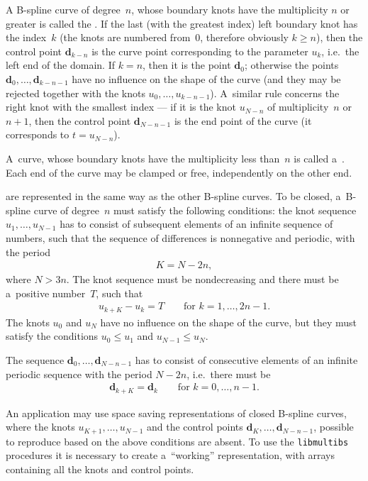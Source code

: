 A B-spline curve of degree~$n$, whose boundary knots have the multiplicity
$n$ or greater is called the .
If the last (with the greatest index) left boundary knot has the index~$k$
(the knots are numbered from~$0$, therefore obviously $k\geq n$), then the
control point $\bm{d}_{k-n}$ is the curve point corresponding to
the parameter $u_k$, i.e.\ the left end of the domain. If $k=n$, then it is
the point $\bm{d}_0$; otherwise the points $\bm{d}_0,\ldots,\bm{d}_{k-n-1}$
have no influence on the shape of the curve (and they may be rejected
together with the knots $u_0,\ldots,u_{k-n-1}$).
A~similar rule concerns the right knot with the smallest index --- if it is
the knot $u_{N-n}$ of multiplicity~$n$ or $n+1$, then the control point
$\bm{d}_{N-n-1}$ is the end point of the curve (it corresponds to $t=u_{N-n}$).

A~curve, whose boundary knots have the multiplicity less than~$n$
is called a~. Each end of the curve may be clamped
or free, independently on the other end.

\vspace{\medskipamount}
 are represented in the same way as the other
B-spline curves. To be closed, a~B-spline curve of degree~$n$ must satisfy
the following conditions: the knot sequence $u_1,\ldots,u_{N-1}$ has to
consist of subsequent elements of an infinite sequence of numbers,
such that the sequence of differences is nonnegative and periodic, with the period
\begin{align*}
  K=N-2n,
\end{align*}
where $N>3n$. The knot sequence must be nondecreasing and there must be
a~positive number~$T$, such that
\begin{align*}
  u_{k+K}-u_k=T\qquad\mbox{for $k=1,\ldots,2n-1$.}
\end{align*}
The knots $u_0$ and $u_N$ have no influence on the shape of the curve,
but they must satisfy the conditions $u_0\leq u_1$ and $u_{N-1}\leq u_N$.

The sequence $\bm{d}_0,\ldots,\bm{d}_{N-n-1}$ has to consist of
consecutive elements of an infinite periodic sequence with the period
$N-2n$, i.e.\ there must be
\begin{align*}
  \bm{d}_{k+K} = \bm{d}_k\qquad\mbox{for $k=0,\ldots,n-1$.}
\end{align*}

\begin{sloppypar}
An application may use space saving representations
of closed B-spline curves, where the knots $u_{K+1},\ldots,u_{N-1}$ and
the control points $\bm{d}_{K},\ldots,\allowbreak\bm{d}_{N-n-1}$, possible to
reproduce based on the above conditions are absent.
To use the \texttt{libmultibs} procedures it is necessary to create
a~``working'' representation, with arrays containing all the knots and
control points.
\end{sloppypar}

